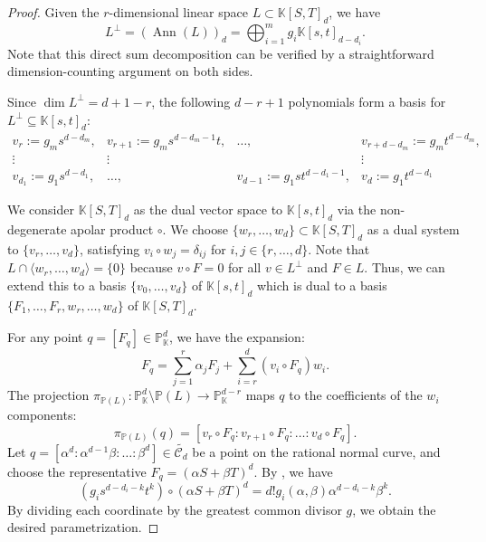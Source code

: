 \documentclass[a4paper, 11pt]{amsart}
\numberwithin{theorem}{section}
\theoremstyle{definition}
\numberwithin{equation}{section}
\begin{document}
\begin{proof}
Given the $r$-dimensional linear space $L \subset \mathbb{K}[S,T]_d$, we have 
\[
L^\perp = \left(\operatorname{Ann}(L)\right)_d = \bigoplus_{i=1}^m g_i \mathbb{K}[s,t]_{d-d_i}.
\]
Note that this direct sum decomposition can be verified by a straightforward dimension-counting argument on both sides.

Since $\dim L^\perp = d+1-r$, the following $d-r+1$ polynomials form a basis for $L^\perp \subseteq \mathbb{K}[s,t]_d$:
\[
\begin{array}{cccc}
v_r := g_m s^{d-d_m}, & v_{r+1} := g_m s^{d-d_m-1}t, & \dots, & v_{r+d-d_m} := g_m t^{d-d_m}, \\[0.3em]
\vdots & \vdots & & \vdots \\[0.3em]
v_{d_1} := g_1 s^{d-d_1}, & \dots, & v_{d-1} := g_1 s t^{d-d_1-1}, & v_d := g_1 t^{d-d_1}
\end{array}
\]

We consider $\mathbb{K}[S,T]_d$ as the dual vector space to $\mathbb{K}[s,t]_d$ via the non-degenerate apolar product $\circ$. We choose $\{w_r, \dots, w_d\} \subset \mathbb{K}[S,T]_d$ as a dual system to $\{v_r, \dots, v_d\}$, satisfying $v_i \circ w_j = \delta_{ij}$ for $i,j \in \{r, \dots, d\}$. 
Note that $L \cap \langle w_r, \dots, w_d \rangle = \{0\}$ because $v \circ F = 0$ for all $v \in L^\perp$ and $F \in L$. 
Thus, we can extend this to a basis $\{v_0, \dots, v_d\}$ of $\mathbb{K}[s,t]_d$ which is dual to a basis $\{F_1, \dots, F_r, w_r, \dots, w_d\}$ of $\mathbb{K}[S,T]_d$.

For any point $q = [F_q] \in \mathbb{P}_{\mathbb{K}}^d$, we have the expansion:
\[
F_q = \sum_{j=1}^r \alpha_j F_j + \sum_{i=r}^d (v_i \circ F_q) w_i.
\]
The projection $\pi_{\mathbb{P}(L)}: \mathbb{P}_{\mathbb{K}}^d \setminus \mathbb{P}(L) \to \mathbb{P}_{\mathbb{K}}^{d-r}$ maps $q$ to the coefficients of the $w_i$ components:
\[
\pi_{\mathbb{P}(L)}(q) = [v_r \circ F_q : v_{r+1} \circ F_q : \dots : v_d \circ F_q].
\]
Let $q = [\alpha^d : \alpha^{d-1}\beta : \dots : \beta^d] \in \widetilde{\mathcal{C}_d}$ be a point on the rational normal curve, and choose the representative $F_q = (\alpha S + \beta T)^d$. 
By , we have
\begin{equation*}
    (g_i s^{d-d_i-k} t^k) \circ (\alpha S + \beta T)^d = d! g_i(\alpha, \beta) \alpha^{d-d_i-k} \beta^k.
\end{equation*}
By dividing each coordinate by the greatest common divisor $g$, we obtain the desired parametrization.
\end{proof}
\end{document}
